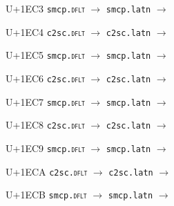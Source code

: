 \documentclass{article}
\begin{document}
\begin{substitutions}
\goodbreak

U+1EC3  \linebreak
    \texttt{smcp.\textsc{dflt}} $\to$  \linebreak
    \texttt{smcp.latn} $\to$  

\goodbreak

U+1EC4  \linebreak
    \texttt{c2sc.\textsc{dflt}} $\to$  \linebreak
    \texttt{c2sc.latn} $\to$  

\goodbreak

U+1EC5  \linebreak
    \texttt{smcp.\textsc{dflt}} $\to$  \linebreak
    \texttt{smcp.latn} $\to$  

\goodbreak

U+1EC6  \linebreak
    \texttt{c2sc.\textsc{dflt}} $\to$  \linebreak
    \texttt{c2sc.latn} $\to$  

\goodbreak

U+1EC7  \linebreak
    \texttt{smcp.\textsc{dflt}} $\to$  \linebreak
    \texttt{smcp.latn} $\to$  

\goodbreak

U+1EC8  \linebreak
    \texttt{c2sc.\textsc{dflt}} $\to$  \linebreak
    \texttt{c2sc.latn} $\to$  

\goodbreak

U+1EC9  \linebreak
    \texttt{smcp.\textsc{dflt}} $\to$  \linebreak
    \texttt{smcp.latn} $\to$  

\goodbreak

U+1ECA  \linebreak
    \texttt{c2sc.\textsc{dflt}} $\to$  \linebreak
    \texttt{c2sc.latn} $\to$  

\goodbreak

U+1ECB  \linebreak
    \texttt{smcp.\textsc{dflt}} $\to$  \linebreak
    \texttt{smcp.latn} $\to$  


\end{substitutions}
\end{document}
